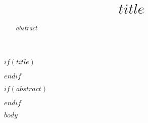 \documentclass[letterpaper,compsoc,twoside,onecolumn]{IEEEtran}
\title{$title$}
\author$if(it.institution)$[$it.institution[,]$]$else$[ ]$endif${$it.name$$if(it.corresponding)$\thanks{Corresponding author: \protect\href{mailto:$it.email$}{$it.email$}}$endif$\thanks{\noindent Copyright\,\copyright\,2021 $it.name$ et al. This is an open-access article distributed under the terms of the Creative Commons Attribution License, which permits unrestricted use, distribution, and reproduction in any medium, provided the original author and source are credited.}}$endfor$
\author$if(it.institution)$[$it.institution[,]$]$else$[ ]$endif${$it.name$$if(it.corresponding)$\thanks{Corresponding author: \protect\href{mailto:$it.email$}{$it.email$}}$endif$}
\affil[$it.order$]{\footnotesize $it.name$}
\begin{document}
$if(title)$
\maketitle
$endif$

$if(abstract)$
\begin{abstract}
$abstract$
\end{abstract}
$endif$

$body$

% 


% 
% 
\end{document}
